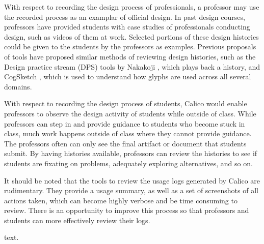 With respect to recording the design process of professionals, a professor may use the recorded process as an examplar of official design. In past design courses, professors have provided students with case studies of professionals conducting design, such as videos of them at work. Selected portions of these design histories could be given to the students by the professors as examples. Previous proposals of tools have proposed similar methods of reviewing design histories, such as the Design practice stream (DPS) tools by Nakakoji \cite{Nakakoji6035659}, which plays back a history, and CogSketch \cite{Forbus1149}, which is used to understand how glyphs are used across all several domains.

With respect to recording the design process of students, Calico would enable professors to observe the design activity of students while outside of class. While professors can step in and provide guidance to students who become stuck in class, much work happens outside of class where they cannot provide guidance. The professors often can only see the final artifact or document that students submit. By having histories available, professors can review the histories to see if students are fixating on problems, adequately exploring alternatives, and so on.

It should be noted that the tools to review the usage logs generated by Calico are rudimentary. They provide a usage summary, as well as a set of screenshots of all actions taken, which can become highly verbose and be time consuming to review. There is an opportunity to improve this process so that professors and students can more effectively review their logs.

%
%

text.


